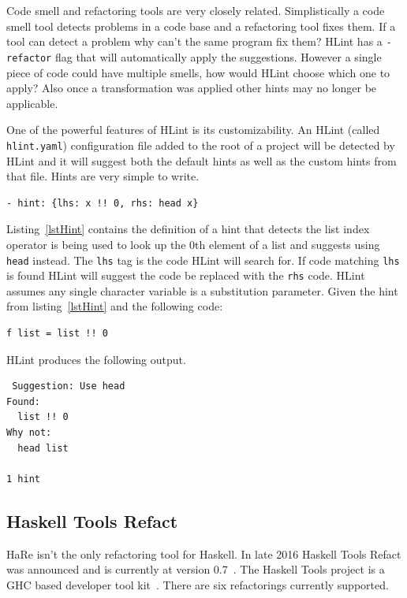 Code smell and refactoring tools are very closely related. Simplistically a code smell tool detects problems in a code base and a refactoring tool fixes them. If a tool can detect a problem why can't the same program fix them? HLint has a \texttt{-refactor} flag that will automatically apply the suggestions. However a single piece of code could have multiple smells, how would HLint choose which one to apply? Also once a transformation was applied other hints may no longer be applicable.

One of the powerful features of HLint is its customizability. An HLint (called \texttt{hlint.yaml}) configuration file added to the root of a project   will be detected by HLint and it will suggest both the default hints as well as the custom hints from that file. Hints are very simple to write.

\begin{lstlisting}[caption={A simple hint from~\citep{hlint}}, label=lstHint]
- hint: {lhs: x !! 0, rhs: head x}
\end{lstlisting}

Listing~\ref{lstHint} contains the definition of a hint that detects the list index operator is being used to look up the 0th element of a list and suggests using \texttt{head} instead. The \texttt{lhs} tag is the code HLint will search for. If code matching \texttt{lhs} is found  HLint will suggest the code be replaced with the \texttt{rhs} code. HLint assumes any single character variable is a substitution parameter. Given the hint from listing~\ref{lstHint} and the following code:

\begin{lstlisting}
f list = list !! 0
\end{lstlisting}

HLint produces the following output.

\begin{lstlisting}
 Suggestion: Use head
Found:
  list !! 0
Why not:
  head list

1 hint
\end{lstlisting}

\subsection{Haskell Tools Refact}

HaRe isn't the only refactoring tool for Haskell. In late 2016 Haskell Tools Refact was announced and is currently at version 0.7~\citep{haskellTools}. The Haskell Tools project is a GHC based developer tool kit~\citep{haskellToolsGit}. There are six refactorings currently supported.

